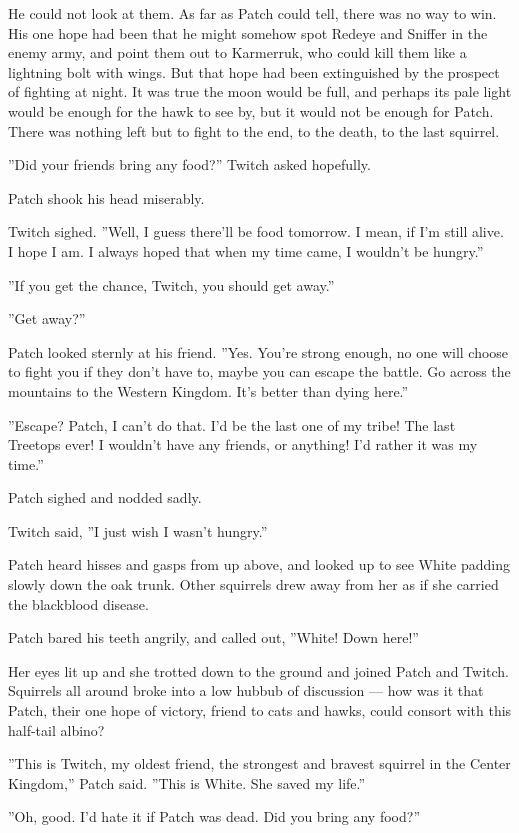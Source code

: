 \documentclass[12pt]{book}
\begin{document}
He could not look at them. As far as Patch could tell, there was no way to win. His one hope had been that he might somehow spot Redeye and Sniffer in the enemy army, and point them out to Karmerruk, who could kill them like a lightning bolt with wings. But that hope had been extinguished by the prospect of fighting at night. It was true the moon would be full, and perhaps its pale light would be enough for the hawk to see by, but it would not be enough for Patch. There was nothing left but to fight to the end, to the death, to the last squirrel. 

''Did your friends bring any food?'' Twitch asked hopefully.

Patch shook his head miserably.

Twitch sighed. ''Well, I guess there'll be food tomorrow. I mean, if I'm still alive. I hope I am. I always hoped that when my time came, I wouldn't be hungry.''

''If you get the chance, Twitch, you should get away.''

''Get away?''

Patch looked sternly at his friend. ''Yes. You're strong enough, no one will choose to fight you if they don't have to, maybe you can escape the battle. Go across the mountains to the Western Kingdom. It's better than dying here.''

''Escape? Patch, I can't do that. I'd be the last one of my tribe! The last Treetops ever! I wouldn't have any friends, or anything! I'd rather it was my time.''

Patch sighed and nodded sadly.

Twitch said, ''I just wish I wasn't hungry.''

Patch heard hisses and gasps from up above, and looked up to see White padding slowly down the oak trunk. Other squirrels drew away from her as if she carried the blackblood disease.

Patch bared his teeth angrily, and called out, ''White! Down here!''

Her eyes lit up and she trotted down to the ground and joined Patch and Twitch. Squirrels all around broke into a low hubbub of discussion ---
how was it that Patch, their one hope of victory, friend to cats and hawks, could consort with this half-tail albino?

''This is Twitch, my oldest friend, the strongest and bravest squirrel in the Center Kingdom,'' Patch said. ''This is White. She saved my life.''

''Oh, good. I'd hate it if Patch was dead. Did you bring any food?''
\end{document}
